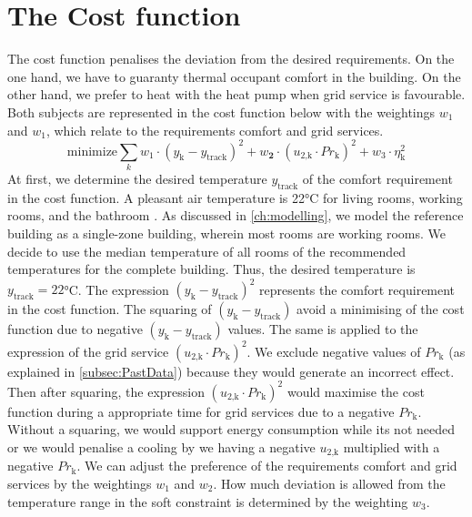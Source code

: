 \section{The Cost function}
\label{section:thecostfunction}

The cost function penalises the deviation from the desired requirements. On the one hand, we have to guaranty thermal occupant comfort in the building. On the other hand, we prefer to heat with the heat pump when grid service is favourable. Both subjects are represented in the cost function below with the weightings $w_\text{1}$ and $w_\text{1}$, which relate to the requirements comfort and grid services.
    \begin{equation}
        \text{minimize} \sum_{k} w_\text{1}\cdot (y_\text{k}-y_\text{track})^2 + w_\textbf{2}\cdot(u_\text{2,k}\cdot Pr_\text{k})^2 + w_\text{3} \cdot \eta_\text{k}^2
        \label{eq:costfunctatsächlich}
    \end{equation}
At first, we determine the desired temperature $y_\text{track}$ of the comfort requirement in the cost function. A pleasant air temperature is 22°C for living rooms, working rooms, and the bathroom \cite{Umweltbundesamt.7.10.2021}. As discussed in \autoref{ch:modelling}, we model the reference building as a single-zone building, wherein most rooms are working rooms. We decide to use the median temperature of all rooms of the recommended temperatures for the complete building. Thus, the desired temperature is $y_\text{track} = 22$°C.\newline
The expression $(y_\text{k}-y_\text{track})^2$ represents the comfort requirement in the cost function. The squaring of $(y_\text{k}-y_\text{track})$ avoid a minimising of the cost function due to negative $(y_\text{k}-y_\text{track})$ values. The same is applied to the expression of the grid service $(u_\text{2,k}\cdot Pr_\text{k})^2$. We exclude negative values of $Pr_\text{k}$ (as explained in \autoref{subsec:PastData}) because they would generate an incorrect effect. Then after squaring, the expression $(u_\text{2,k}\cdot Pr_\text{k})^2$ would maximise the cost function during a appropriate time for grid services due to a negative $Pr_\text{k}$. Without a squaring, we would support energy consumption while its not needed or we would penalise a cooling by we having a negative $u_\text{2,k}$ multiplied with a negative $Pr_\text{k}$.\newline
We can adjust the preference of the requirements comfort and grid services by the weightings $w_\text{1}$ and $w_\text{2}$. How much deviation is allowed from the temperature range in the soft constraint is determined by the weighting $w_\text{3}$.\newline
